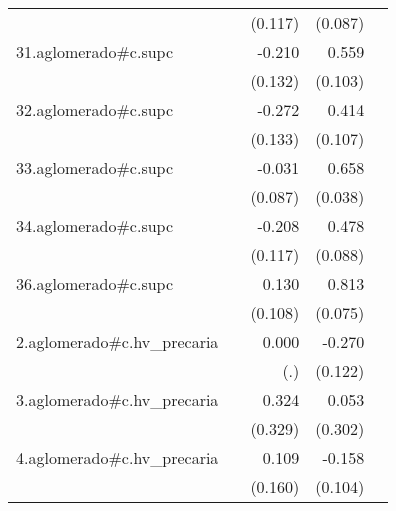 {\begin{longtable}{l*{4}{D{.}{.}{-1}}}
            &                     &     (0.117)         &     (0.087)         &                     \\
\addlinespace
31.aglomerado#c.supc&                     &      -0.210         &       0.559\sym{***}&                     \\
            &                     &     (0.132)         &     (0.103)         &                     \\
\addlinespace
32.aglomerado#c.supc&                     &      -0.272\sym{*}  &       0.414\sym{***}&                     \\
            &                     &     (0.133)         &     (0.107)         &                     \\
\addlinespace
33.aglomerado#c.supc&                     &      -0.031         &       0.658\sym{***}&                     \\
            &                     &     (0.087)         &     (0.038)         &                     \\
\addlinespace
34.aglomerado#c.supc&                     &      -0.208         &       0.478\sym{***}&                     \\
            &                     &     (0.117)         &     (0.088)         &                     \\
\addlinespace
36.aglomerado#c.supc&                     &       0.130         &       0.813\sym{***}&                     \\
            &                     &     (0.108)         &     (0.075)         &                     \\
\addlinespace
2.aglomerado#c.hv\_precaria&                     &       0.000         &      -0.270\sym{*}  &                     \\
            &                     &         (.)         &     (0.122)         &                     \\
\addlinespace
3.aglomerado#c.hv\_precaria&                     &       0.324         &       0.053         &                     \\
            &                     &     (0.329)         &     (0.302)         &                     \\
\addlinespace
4.aglomerado#c.hv\_precaria&                     &       0.109         &      -0.158         &                     \\
            &                     &     (0.160)         &     (0.104)         &                     \\

\end{longtable}}
